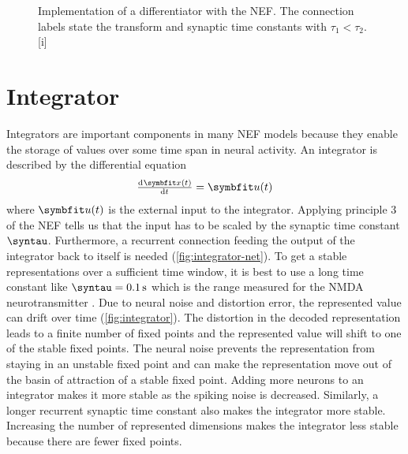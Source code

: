\begin{figure}
    \begin{captionbeside}{Implementation of a differentiator with the NEF\@. The connection labels state the transform and synaptic time constants with $\tau_1 < \tau_2$.\label{fig:differentiator-net}}[i]
    \end{captionbeside}
\end{figure}


\section{Integrator}
Integrators are important components in many NEF models because they enable the storage of values over some time span in neural activity.
An integrator is described by the differential equation
\begin{equation}
    \od{\vc x(t)}{t} = \vc u(t)
\end{equation}
where $\vc u(t)$ is the external input to the integrator.
Applying principle 3 of the NEF tells us that the input has to be scaled by the synaptic time constant $\syntau$.
Furthermore, a recurrent connection feeding the output of the integrator back to itself is needed (\cref{fig:integrator-net}).
To get a stable representations over a sufficient time window, it is best to use a long time constant like $\syntau = \SI{0.1}{\second}$ which is the range measured for the NMDA neurotransmitter \parencite{sah1990-1,moreno-bote2005}.
Due to neural noise and distortion error, the represented value can drift over time (\cref{fig:integrator}).
The distortion in the decoded representation leads to a finite number of fixed points and the represented value will shift to one of the stable fixed points.
The neural noise prevents the representation from staying in an unstable fixed point and can make the representation move out of the basin of attraction of a stable fixed point.
Adding more neurons to an integrator makes it more stable as the spiking noise is decreased.
Similarly, a longer recurrent synaptic time constant also makes the integrator more stable.
Increasing the number of represented dimensions makes the integrator less stable because there are fewer fixed points.
